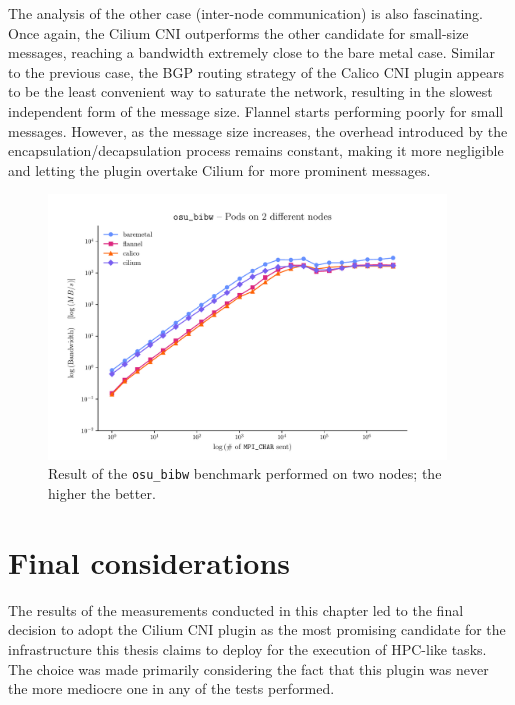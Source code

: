 The analysis of the other case (inter-node communication) is also fascinating.
Once again, the Cilium CNI outperforms the other candidate for small-size
messages, reaching a bandwidth extremely close to the bare metal case.
Similar to the previous case, the BGP routing strategy of the Calico CNI plugin
appears to be the least convenient way to saturate the network, resulting in the
slowest independent form of the message size.
Flannel starts performing poorly for small messages. However, as the message
size increases, the overhead introduced by the encapsulation/decapsulation
process remains constant, making it more negligible and letting the plugin
overtake Cilium for more prominent messages.

\begin{figure}[H]
  \centering
  \includegraphics[width=0.94\textwidth]{img/chpt3/bibw-2-nodes}
  \caption{Result of the \texttt{osu\_bibw} benchmark performed on two nodes; the
    higher the better.}
  \label{fig:bibw-2-nodes}
\end{figure}

\section{Final considerations}\label{sec:final-considerations}

The results of the measurements conducted in this chapter led to the final
decision to adopt the Cilium CNI plugin as the most promising candidate for the
infrastructure this thesis claims to deploy for the execution of HPC-like tasks.
The choice was made primarily considering the fact that this plugin was never
the more mediocre one in any of the tests performed.

